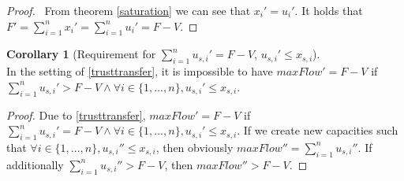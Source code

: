 \documentclass[11pt]{article}
\theoremstyle{definition}
\theoremstyle{corollary}
\newtheorem{corollary}{Corollary}[section]
\begin{document}
    \begin{proof} \
        From theorem \ref{saturation} we can see that $x_i' = u_i'$. It holds that $F' = \sum\limits_{i=1}^nx_i' =
        \sum\limits_{i=1}^nu_i' = F - V$.
    \end{proof}

    \begin{corollary}[Requirement for $\sum\limits_{i=1}^{n}{u_{s, i}'} = F - V$, $u_{s, i}' \leq x_{s, i}$] \ \\
       In the setting of \ref{trusttransfer}, it is impossible to have $maxFlow' = F - V$ if
       $\sum\limits_{i=1}^{n}{u_{s, i}'} > F - V \wedge \forall i \in \{1,...,n\},u_{s, i}' \leq x_{s, i}$.
    \end{corollary}
    \begin{proof}
       Due to \ref{trusttransfer}, $maxFlow' = F - V$ if $\sum\limits_{i=1}^{n}{u_{s, i}'} = F - V
       \wedge \forall i \in \{1,...,n\}, u_{s, i}' \leq x_{s, i}$. If we create new capacities such that
       $\forall i \in \{1,...,n\}, u_{s,i}'' \leq x_{s,i}$, then obviously $maxFlow'' = \sum\limits_{i=1}^{n}{u_{s,i}''}$. If
       additionally $\sum\limits_{i=1}^{n}{u_{s,i}''} > F - V$, then $maxFlow'' > F - V$.
    \end{proof}
\end{document}
